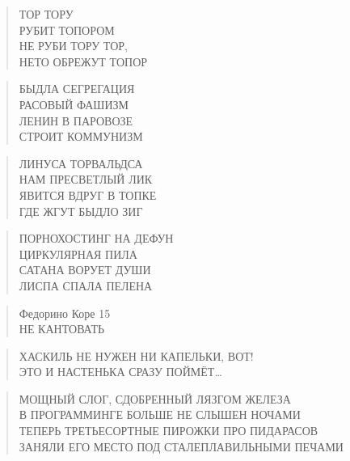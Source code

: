 \poemtitle{***}
\begin{verse}
ТОР ТОРУ\\
РУБИТ ТОПОРОМ\\
НЕ РУБИ ТОРУ ТОР,\\
НЕТО ОБРЕЖУТ ТОПОР
\end{verse}

\poemtitle{***}
\begin{verse}
БЫДЛА СЕГРЕГАЦИЯ\\
РАСОВЫЙ ФАШИЗМ\\
ЛЕНИН В ПАРОВОЗЕ\\
СТРОИТ КОММУНИЗМ
\end{verse}

\poemtitle{***}
\begin{verse}
ЛИНУСА ТОРВАЛЬДСА\\
НАМ ПРЕСВЕТЛЫЙ ЛИК\\
ЯВИТСЯ ВДРУГ В ТОПКЕ\\
ГДЕ ЖГУТ БЫДЛО ЗИГ
\end{verse}

\poemtitle{***}
\begin{verse}
ПОРНОХОСТИНГ НА ДЕФУН\\
ЦИРКУЛЯРНАЯ ПИЛА\\
САТАНА ВОРУЕТ ДУШИ\\
ЛИСПА СПАЛА ПЕЛЕНА
\end{verse}

\poemtitle{***}
\begin{verse}
Федорино Коре 15\\
НЕ КАНТОВАТЬ
\end{verse}

\poemtitle{***}
\begin{verse}
ХАСКИЛЬ НЕ НУЖЕН НИ КАПЕЛЬКИ, ВОТ!\\
ЭТО И НАСТЕНЬКА СРАЗУ ПОЙМЁТ…
\end{verse}

\poemtitle{***}
\begin{verse}
МОЩНЫЙ СЛОГ, СДОБРЕННЫЙ ЛЯЗГОМ ЖЕЛЕЗА\\
В ПРОГРАММИНГЕ БОЛЬШЕ НЕ СЛЫШЕН НОЧАМИ\\
ТЕПЕРЬ ТРЕТЬЕСОРТНЫЕ ПИРОЖКИ ПРО ПИДАРАСОВ\\
ЗАНЯЛИ ЕГО МЕСТО ПОД СТАЛЕПЛАВИЛЬНЫМИ ПЕЧАМИ
\end{verse}

